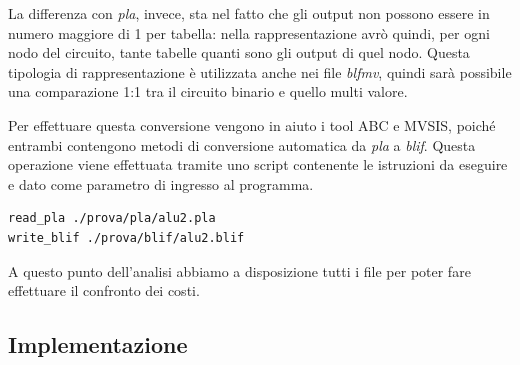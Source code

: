 \documentclass[italian,]{book}
\begin{document}
La differenza con \emph{pla}, invece, sta nel fatto che gli output non possono essere in numero maggiore di 1 per tabella: nella rappresentazione avrò quindi, per ogni nodo del circuito, tante tabelle quanti sono gli output di quel nodo. Questa tipologia di rappresentazione è utilizzata anche nei file \emph{blfmv}, quindi sarà possibile una comparazione 1:1 tra il circuito binario e quello multi valore.

Per effettuare questa conversione vengono in aiuto i tool ABC e MVSIS, poiché entrambi contengono metodi di conversione automatica da \emph{pla} a \emph{blif}. Questa operazione viene effettuata tramite uno script contenente le istruzioni da eseguire e dato come parametro di ingresso al programma. \citep{kukimoto1996blif}

\begin{verbatim}
read_pla ./prova/pla/alu2.pla
write_blif ./prova/blif/alu2.blif
\end{verbatim}

A questo punto dell'analisi abbiamo a disposizione tutti i file per poter fare effettuare il confronto dei costi.

\newpage

\hypertarget{implementazione}{%
\subsection{Implementazione}\label{implementazione}}
\end{document}
